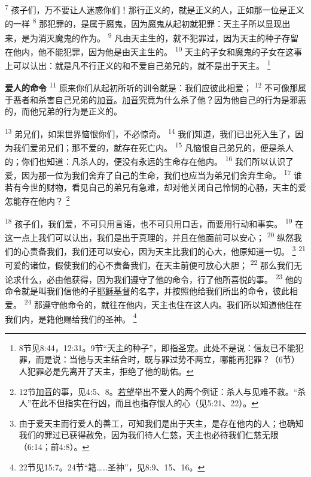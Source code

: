 \begin{multicols}{2}
\textsuperscript{7}
孩子们，万不要让人迷惑你们！那行正义的，就是正义的人，正如那一位是正义的一样
\textsuperscript{8}
那犯罪的，是属于魔鬼，因为魔鬼从起初就犯罪：天主子所以显现出来，是为消灭魔鬼的作为。
\textsuperscript{9}
凡由天主生的，就不犯罪过，因为天主的种子存留在他内，他不能犯罪，因为他是由天主生的。
\textsuperscript{10}
天主的子女和魔鬼的子女在这事上可以认出：就是凡不行正义的和不爱自己弟兄的，就不是出于天主。
\footnote{8节见8:44，12:31。9节“天主的种子”，即指圣宠。此处不是说：信友已不能犯罪，而是说：当他与天主结合时，既与罪过势不两立，哪能再犯罪？（6节）人犯罪必是先离开了天主，拒绝了他的助佑。}

\textbf{爱人的命令\quad}
\textsuperscript{11}
原来你们从起初所听的训令就是：我们应彼此相爱；
\textsuperscript{12}
不可像那属于恶者和杀害自己兄弟的\uline{加音}。\uline{加音}究竟为什么杀了他？因为他自己的行为是邪恶的，而他兄弟的行为是正义的。

\textsuperscript{13}
弟兄们，如果世界恼恨你们，不必惊奇。
\textsuperscript{14}
我们知道，我们已出死入生了，因为我们爱弟兄们；那不爱的，就存在死亡内。
\textsuperscript{15}
凡恼恨自己弟兄的，便是杀人的；你们也知道：凡杀人的，便没有永远的生命存在他内。
\textsuperscript{16}
我们所以认识了爱，因为那一位为我们舍弃了自己的生命，我们也应当为弟兄们舍弃生命。
\textsuperscript{17}
谁若有今世的财物，看见自己的弟兄有急难，却对他关闭自己怜悯的心肠，天主的爱怎能存在他内？
\footnote{12节\uline{加音}的事，见4:5、8。\uline{若望}举出不爱人的两个例证：杀人与见难不救。“杀人”在此不但指实在行凶，而且也指存恨人的心（见5:21、22）。}

\textsuperscript{18}
孩子们，我们爱，不可只用言语，也不可只用口舌，而要用行动和事实。
\textsuperscript{19}
在这一点上我们可以认出，我们是出于真理的，并且在他面前可以安心；
\textsuperscript{20}
纵然我们的心责备我们，我们还可以安心，因为天主比我们的心大，他原知道一切。
\footnote{由于爱天主而行爱人的善工，可知我们是出于天主，是存在他内的人；也确知我们的罪过已获得赦免，因为我们待人仁慈，天主也必待我们仁慈无限（6:14；前4:8）。}
\textsuperscript{21}
可爱的诸位，假使我们的心不责备我们，在天主前便可放心大胆；
\textsuperscript{22}
那么我们无论求什么，必由他获得，因为我们遵守了他的命令，行了他所喜悦的事。
\textsuperscript{23}
他的命令就是叫我们信他的子\uline{耶稣}\uline{基督}的名字，并按照他给我们所出的命令，彼此相爱。
\textsuperscript{24}
那遵守他命令的，就往在他内，天主也住在这人内。我们所以知道他住在我们内，是籍他赐给我们的圣神。
\footnote{22节见15:7。24节“籍……圣神”，见8:9、15、16。}


\end{multicols}
